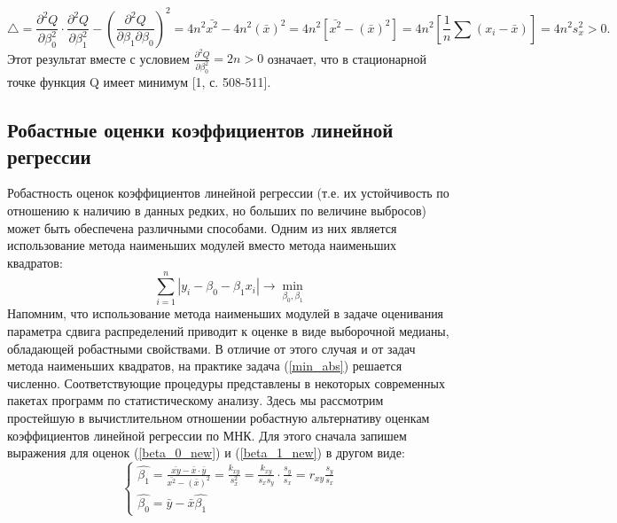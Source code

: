 \documentclass[a4paper]{article}
\begin{document}
            \begin{equation}
                \bigtriangleup = \frac{\partial^{2}Q}{\partial \beta_{0}^{2}} \cdot \frac{\partial^{2}Q}{\partial \beta_{1}^{2}} - (\frac{\partial^{2}Q}{\partial \beta_{1} \partial \beta_{0}})^{2} =
                4n^{2}\bar{x^{2}} - 4n^2(\bar{x})^{2} =
                4n^{2}\left[\bar{x^{2}} - (\bar{x})^{2}\right] = 4n^{2}\left[ \frac{1}{n}\sum{}_{}{(x_{i} - \bar{x})}\right] = 4n^{2}s_{x}^{2} > 0.
                \label{det_sys}
            \end{equation}
            Этот результат вместе с условием $\frac{\partial^{2}Q}{\partial \beta_{0}^{2}} = 2n > 0$ означает, что в стационарной точке функция Q имеет минимум [1, с. 508-511].
        \subsection{Робастные оценки коэффициентов линейной регрессии}
            \noindent Робастность оценок коэффициентов линейной регрессии (т.е. их устойчивость по отношению к наличию в данных редких, но больших по величине выбросов) может быть обеспечена различными способами. Одним из них является использование метода наименьших модулей вместо метода наименьших квадратов:
            \begin{equation}
                \sum_{i=1}^{n}{|y_{i} - \beta_{0} - \beta_{1}x_{i}|}\rightarrow \min_{\beta_{0}, \beta_{1}}
                \label{min_abs}
            \end{equation}
            Напомним, что использование метода наименьших модулей в задаче оценивания параметра сдвига распределений приводит к оценке в виде выборочной медианы, обладающей робастными свойствами. В отличие от этого случая и от задач метода наименьших квадратов, на практике задача (\ref{min_abs}) решается численно. Соответствующие процедуры представлены в некоторых современных пакетах программ по статистическому анализу.
            \newline
            Здесь мы рассмотрим простейшую в вычистлительном отношении робастную альтернативу оценкам коэффициентов линейной регрессии по МНК. Для этого сначала запишем выражения для оценок (\ref{beta_0_new}) и (\ref{beta_1_new}) в другом виде:
            \begin{equation}
                \begin{cases}
                \hat{\beta_{1}} = \frac{\bar{xy} - \bar{x} \cdot \bar{y}}{\bar{x^{2}} - (\bar{x})^{2}} = \frac{k_{xy}}{s_{x}^{2}} = \frac{k_{xy}}{s_{x}s_{y}} \cdot \frac{s_{y}}{s_{x}} = r_{xy}\frac{s_{y}}{s_{x}} \\
                \hat{\beta_{0}} = \bar{y} - \bar{x}\hat{\beta_{1}}
                \end{cases}
                \label{new_coef_abs}
            \end{equation}
\end{document}
